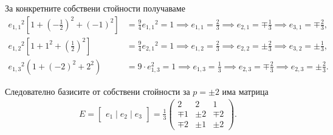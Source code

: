 \documentclass[numbers=endperiod, bibliography=totocnumbered]{scrartcl}
\begin{document}
\begin{solution}
  За конкретните собствени стойности получаваме
  \begin{align*}
    {e_{1,1}}^2 \left[1 + {\left( - \tfrac 1 2 \right)}^2 + {(-1)}^2 \right] &= \frac 9 4 {e_{1,1}}^2 = 1 \implies e_{1,1} = \frac 2 3 \implies e_{2,1} = \mp \frac 1 3 \implies e_{3,1} = \mp \frac 2 3,
    \\
    {e_{1,2}}^2 \left[1 + 1^2 + {\left( \frac 1 2 \right)}^2 \right] &= \frac 9 4 {e_{2,1}}^2 = 1 \implies e_{1,2} = \frac 2 3 \implies e_{2,2} = \pm \frac 2 3 \implies e_{3,2} = \pm \frac 1 3,
    \\
    {e_{1,3}}^2 \left(1 + {(-2)}^2 + 2^2 \right) &= 9 \cdot {e_{1,3}^2} = 1 \implies e_{1,3} = \frac 1 3 \implies e_{2,3} = \mp \frac 2 3 \implies e_{2,3} = \pm \frac 2 3.
  \end{align*}

  Следователно базисите от собствени стойности за \( p = \pm 2 \) има матрица
  \begin{align*}
    E = \begin{bmatrix} e_1 \mid e_2 \mid e_3 \end{bmatrix} = \frac 1 3 \begin{pmatrix}
          2 &     2 &     1 \\
      \mp 1 & \pm 2 & \mp 2 \\
      \mp 2 & \pm 1 & \pm 2
    \end{pmatrix}.
  \end{align*}


\end{solution}
\end{document}
